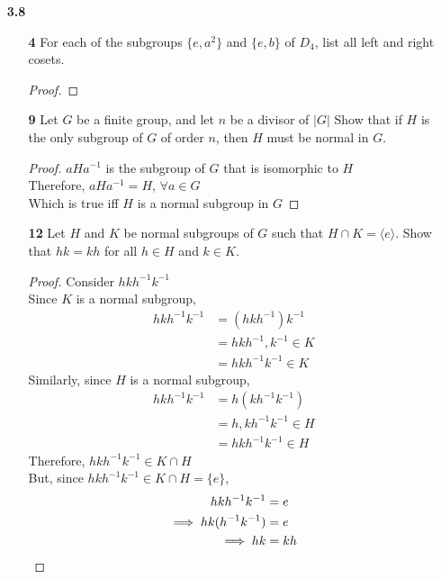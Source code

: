 \documentclass[paper=usletter, fontsize=12pt]{article}
\begin{document}
\begin{itemize}
        \item[\textbf{3.8}]
        \begin{enumerate}

            \item[\textbf{4}] For each of the subgroups $\{e, a^2\}$ and
            $\{e,b\}$ of $D_4$, list all left and right cosets.
            \begin{proof}
            \end{proof}

            \item[\textbf{9}] Let $G$ be a finite group, and let $n$ be a
            divisor of $|G|$ Show that if $H$ is the only subgroup of $G$ of
            order $n$, then $H$ must be normal in $G$.
            \begin{proof}

                $aHa^{-1}$ is the subgroup of $G$ that is isomorphic to $H$\\
                Therefore, $aHa^{-1}=H$, $\forall a \in G$\\
                Which is true iff $H$ is a normal subgroup in $G$ \qedhere

            \end{proof}

            \item[\textbf{12}] Let $H$ and $K$ be normal subgroups of $G$ such
            that $H \cap K=\langle e \rangle$. Show that $hk=kh$ for all $h \in
            H$ and $k \in K$.
            \begin{proof}

                Consider $hkh^{-1}k^{-1}$\\
                Since $K$ is a normal subgroup,
                \begin{align*}
                    hkh^{-1}k^{-1} & = (hkh^{-1})k^{-1}\\
                    & = hkh^{-1},k^{-1} \in K\\
                    & = hkh^{-1}k^{-1} \in K
                \end{align*}
                Similarly, since $H$ is a normal subgroup,
                \begin{align*}
                    hkh^{-1}k^{-1} & = h(kh^{-1}k^{-1})\\
                    & = h,kh^{-1}k^{-1} \in H\\
                    & = hkh^{-1}k^{-1} \in H
                \end{align*}
                Therefore, $hkh^{-1}k^{-1} \in K \cap H$\\
                But, since $hkh^{-1}k^{-1} \in K \cap H = \{e\}$,
                \begin{align*}
                    hkh^{-1}k^{-1} &= e\\
                    \implies hk(h^{-1}k^{-1}) &= e\\
                    \implies hk &= kh \qedhere
                \end{align*}


\end{proof}
\end{enumerate}
\end{itemize}
\end{document}
